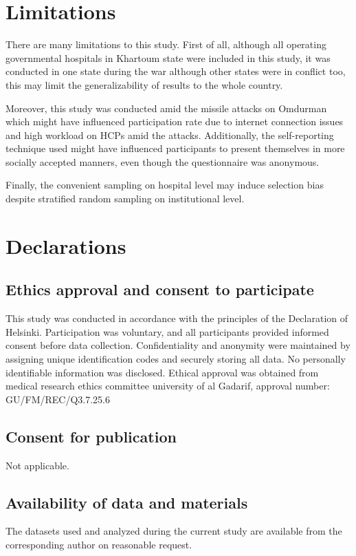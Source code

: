 \documentclass[12pt]{article}
\begin{document}
\section{Limitations}
There are many limitations to this study. First of all, although all operating governmental hospitals in Khartoum state were included in this study, it was conducted in one state during the war although other states were in conflict too, this may limit the generalizability of results to the whole country.

Moreover, this study was conducted amid the missile attacks on Omdurman which might have influenced participation rate due to internet connection issues and high workload on HCPs amid the attacks. Additionally, the self-reporting technique used might have influenced participants to present themselves in more socially accepted manners, even though the questionnaire was anonymous.

Finally, the convenient sampling on hospital level may induce selection bias despite stratified random sampling on institutional level.

\section*{Declarations}
\subsection*{Ethics approval and consent to participate}
This study was conducted in accordance with the principles of the Declaration of Helsinki. Participation was voluntary, and all participants provided informed consent before data collection. Confidentiality and anonymity were maintained by assigning unique identification codes and securely storing all data. No personally identifiable information was disclosed. Ethical approval was obtained from medical research ethics committee university of al Gadarif, approval number: GU/FM/REC/Q3.7.25.6

\subsection*{Consent for publication}
Not applicable.

\subsection*{Availability of data and materials}
The datasets used and analyzed during the current study are available from the corresponding author on reasonable request.
\end{document}
